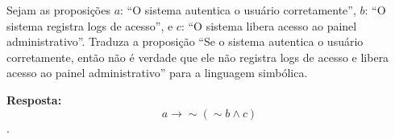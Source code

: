 \documentclass{ufcdocument}
\begin{document}
\def\course{Lógica para Ciência da Computação}
\def\prof{Esdras Lins Bispo Jr.}
\def\semester{2026.1}
\def\codeCourse{ICE0239}
\def\registration{}
\def\student{}
\def\graduate{Bacharelado em Ciência da Computação}
\def\theme{Avaliação da Competência LCC C1.2:\\ \texttt{Conversão da linguagem natural para simbólica.}\\
28 de abril de 2026
}
    \makeheader
    
    \vspace{0.5cm}
    
     \begin{question}
        \item Sejam as proposições $a$: ``O sistema autentica o usuário corretamente'', $b$: ``O sistema registra logs de acesso'', e $c$: ``O sistema libera acesso ao painel administrativo''. Traduza a proposição ``Se o sistema autentica o usuário corretamente, então não é verdade que ele não registra logs de acesso e libera acesso ao painel administrativo'' para a linguagem simbólica.
    \end{question}

    \vspace{0.3cm}
        
    {\color{blue} {\bf Resposta:} 
        $$a \to \sim (\sim b \wedge c)$$
    .}
 
    \vfill
\end{document}
